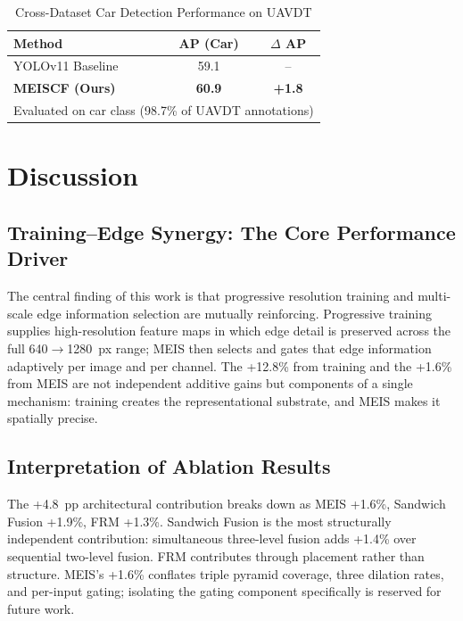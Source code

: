 \documentclass[preprint,12pt]{elsarticle}
\begin{document}
\begin{table}[t]
\centering
\caption{Cross-Dataset Car Detection Performance on UAVDT}
\label{tab:uavdt}
\small
\begin{tabular}{lcc}
\toprule
\textbf{Method} & \textbf{AP (Car)} & \textbf{$\Delta$ AP} \\
\midrule
YOLOv11 Baseline & 59.1 & -- \\
\textbf{MEISCF (Ours)} & \textbf{60.9} & \textbf{+1.8} \\
\bottomrule
\multicolumn{3}{l}{\scriptsize Evaluated on car class (98.7\% of UAVDT annotations)} \\
\end{tabular}
\end{table}



\section{Discussion}
\label{sec:discussion}

\subsection{Training--Edge Synergy: The Core Performance Driver}

The central finding of this work is that progressive resolution training and
multi-scale edge information selection are mutually reinforcing. Progressive
training supplies high-resolution feature maps in which edge detail is preserved
across the full 640$\to$1280~px range; MEIS then selects and gates that edge
information adaptively per image and per channel. The +12.8\% from training and
the +1.6\% from MEIS are not independent additive gains but components of a single
mechanism: training creates the representational substrate, and MEIS makes it
spatially precise.

\subsection{Interpretation of Ablation Results}

The +4.8~pp architectural contribution breaks down as MEIS +1.6\%, Sandwich Fusion
+1.9\%, FRM +1.3\%. Sandwich Fusion is the most structurally independent
contribution: simultaneous three-level fusion adds +1.4\% over sequential
two-level fusion. FRM contributes through placement rather than structure. MEIS's
+1.6\% conflates triple pyramid coverage, three dilation rates, and per-input
gating; isolating the gating component specifically is reserved for future work.
\end{document}
